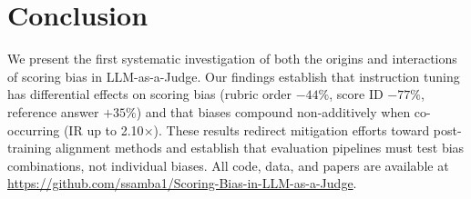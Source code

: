 \documentclass[11pt,twocolumn]{article}
\begin{document}
\section{Conclusion}

We present the first systematic investigation of both the origins and interactions of scoring bias in LLM-as-a-Judge. Our findings establish that instruction tuning has differential effects on scoring bias (rubric order $-44\%$, score ID $-77\%$, reference answer $+35\%$) and that biases compound non-additively when co-occurring (IR up to 2.10$\times$). These results redirect mitigation efforts toward post-training alignment methods and establish that evaluation pipelines must test bias combinations, not individual biases. All code, data, and papers are available at \url{https://github.com/ssamba1/Scoring-Bias-in-LLM-as-a-Judge}.
\end{document}
